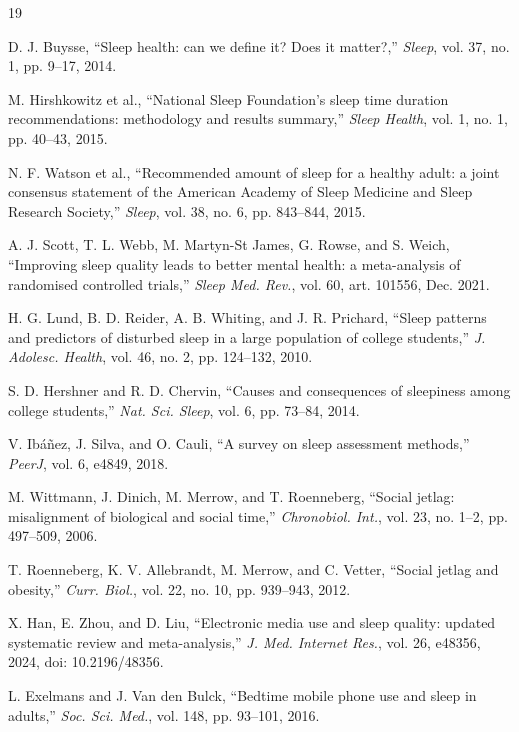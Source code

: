 \documentclass[conference]{IEEEtran}
\begin{document}
\begin{thebibliography}{19}

 D. J. Buysse, ``Sleep health: can we define it? Does it matter?,'' \emph{Sleep}, vol. 37, no. 1, pp. 9--17, 2014.

 M. Hirshkowitz et al., ``National Sleep Foundation's sleep time duration recommendations: methodology and results summary,'' \emph{Sleep Health}, vol. 1, no. 1, pp. 40--43, 2015.

 N. F. Watson et al., ``Recommended amount of sleep for a healthy adult: a joint consensus statement of the American Academy of Sleep Medicine and Sleep Research Society,'' \emph{Sleep}, vol. 38, no. 6, pp. 843--844, 2015.

 A. J. Scott, T. L. Webb, M. Martyn-St James, G. Rowse, and S. Weich, ``Improving sleep quality leads to better mental health: a meta-analysis of randomised controlled trials,'' \emph{Sleep Med. Rev.}, vol. 60, art. 101556, Dec. 2021.

 H. G. Lund, B. D. Reider, A. B. Whiting, and J. R. Prichard, ``Sleep patterns and predictors of disturbed sleep in a large population of college students,'' \emph{J. Adolesc. Health}, vol. 46, no. 2, pp. 124--132, 2010.

 S. D. Hershner and R. D. Chervin, ``Causes and consequences of sleepiness among college students,'' \emph{Nat. Sci. Sleep}, vol. 6, pp. 73--84, 2014.

 V. Ibáñez, J. Silva, and O. Cauli, ``A survey on sleep assessment methods,'' \emph{PeerJ}, vol. 6, e4849, 2018.

 M. Wittmann, J. Dinich, M. Merrow, and T. Roenneberg, ``Social jetlag: misalignment of biological and social time,'' \emph{Chronobiol. Int.}, vol. 23, no. 1--2, pp. 497--509, 2006.

 T. Roenneberg, K. V. Allebrandt, M. Merrow, and C. Vetter, ``Social jetlag and obesity,'' \emph{Curr. Biol.}, vol. 22, no. 10, pp. 939--943, 2012.

 X. Han, E. Zhou, and D. Liu, ``Electronic media use and sleep quality: updated systematic review and meta-analysis,'' \emph{J. Med. Internet Res.}, vol. 26, e48356, 2024, doi: 10.2196/48356.

 L. Exelmans and J. Van den Bulck, ``Bedtime mobile phone use and sleep in adults,'' \emph{Soc. Sci. Med.}, vol. 148, pp. 93--101, 2016.


\end{thebibliography}
\end{document}
